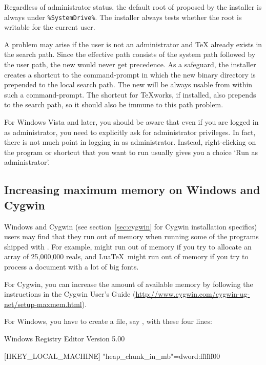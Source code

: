 \documentclass{article}
\begin{document}
Regardless of administrator status, the default root of \TL{} proposed
by the installer is always under \verb|%SystemDrive%|. The installer
always tests whether the root is writable for the current user.

A problem may arise if the user is not an administrator and \TeX{}
already exists in the search path.  Since the effective path
consists of the system path followed by the user path, the new \TL{}
would never get precedence.  As a safeguard, the installer creates a
shortcut to the command-prompt in which the new \TL{} binary
directory is prepended to the local search path.  The new \TL{} will
be always usable from within such a command-prompt. The shortcut for
\TeX{}works, if installed, also prepends \TL{} to the search path, so it
should also be immune to this path problem.

For Windows Vista and later, you should be aware that even if you are
logged in as administrator, you need to explicitly ask for administrator
privileges. In fact, there is not much point in logging in as
administrator. Instead, right-clicking on the program or shortcut that
you want to run usually gives you a choice `Run as administrator'.

\subsection{Increasing maximum memory on Windows and Cygwin}
\label{sec:cygwin-maxmem}

Windows and Cygwin (see section~\ref{sec:cygwin} for Cygwin installation
specifics) users may find that they run out of memory when running some
of the programs shipped with \TL.  For example,  might run out
of memory if you try to allocate an array of 25,000,000 reals, and
Lua\TeX\ might run out of memory if you try to process a document with a
lot of big fonts.

For Cygwin, you can increase the amount of available memory by following
the instructions in the Cygwin User's Guide
(\url{http://www.cygwin.com/cygwin-ug-net/setup-maxmem.html}).

For Windows, you have to create a file, say , with
these four lines:

\begin{sverbatim}
Windows Registry Editor Version 5.00

[HKEY_LOCAL_MACHINE\Software\Cygwin]
"heap_chunk_in_mb"=dword:ffffff00
\end{sverbatim}
\end{document}
